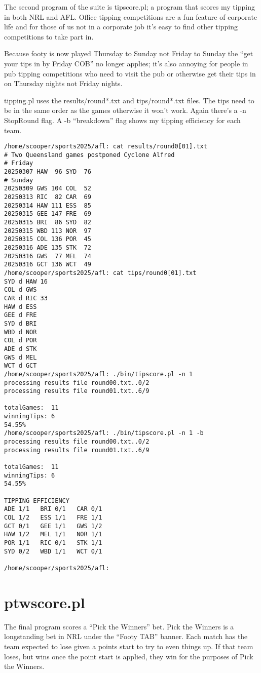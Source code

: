 \documentclass{article}      %
\begin{document}
The second program of the suite is tipscore.pl; a program that scores
my tipping in both NRL and AFL. Office tipping competitions are a fun
feature of corporate life and for those of us not in a corporate job
it's easy to find other tipping competitions to take part in.

Because footy is now played Thursday to Sunday not Friday to Sunday
the ``get your tips in by Friday COB'' no longer applies; it's also
annoying for people in pub tipping competitions who need to visit the
pub or otherwise get their tips in on Thursday nights not Friday
nights.

tipping.pl uses the results/round*.txt and tips/round*.txt files. The
tips need to be in the same order as the games otherwise it won't
work. Again there's a -n StopRound flag. A -b ``breakdown'' flag shows
my tipping efficiency for each team.

\begin{verbatim}
/home/scooper/sports2025/afl: cat results/round0[01].txt
# Two Queensland games postponed Cyclone Alfred
# Friday
20250307 HAW  96 SYD  76
# Sunday
20250309 GWS 104 COL  52
20250313 RIC  82 CAR  69
20250314 HAW 111 ESS  85
20250315 GEE 147 FRE  69
20250315 BRI  86 SYD  82
20250315 WBD 113 NOR  97
20250315 COL 136 POR  45
20250316 ADE 135 STK  72
20250316 GWS  77 MEL  74
20250316 GCT 136 WCT  49
/home/scooper/sports2025/afl: cat tips/round0[01].txt
SYD d HAW 16
COL d GWS
CAR d RIC 33
HAW d ESS
GEE d FRE
SYD d BRI
WBD d NOR
COL d POR
ADE d STK
GWS d MEL
WCT d GCT
/home/scooper/sports2025/afl: ./bin/tipscore.pl -n 1
processing results file round00.txt..0/2
processing results file round01.txt..6/9

totalGames:  11
winningTips: 6
54.55%
/home/scooper/sports2025/afl: ./bin/tipscore.pl -n 1 -b
processing results file round00.txt..0/2
processing results file round01.txt..6/9

totalGames:  11
winningTips: 6
54.55%

TIPPING EFFICIENCY
ADE 1/1   BRI 0/1   CAR 0/1
COL 1/2   ESS 1/1   FRE 1/1
GCT 0/1   GEE 1/1   GWS 1/2
HAW 1/2   MEL 1/1   NOR 1/1
POR 1/1   RIC 0/1   STK 1/1
SYD 0/2   WBD 1/1   WCT 0/1

/home/scooper/sports2025/afl:
\end{verbatim}

\section{ptwscore.pl}

The final program scores a ``Pick the Winners'' bet. Pick the Winners
is a longstanding bet in NRL under the ``Footy TAB'' banner. Each
match has the team expected to lose given a points start to try to
even things up. If that team loses, but wins once the point start is
applied, they win for the purposes of Pick the Winners.
\end{document}
